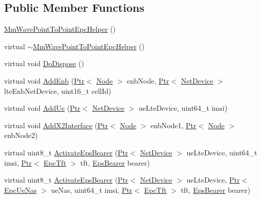 \subsection*{Public Member Functions}
\begin{DoxyCompactItemize}
\item 
\hyperlink{classns3_1_1MmWavePointToPointEpcHelper_a45b842e4b0bda8e4df3a3826c0b945b3}{Mm\+Wave\+Point\+To\+Point\+Epc\+Helper} ()
\item 
virtual \hyperlink{classns3_1_1MmWavePointToPointEpcHelper_a6e19a1cf9dba2dbb72bfab27cf1819b5}{$\sim$\+Mm\+Wave\+Point\+To\+Point\+Epc\+Helper} ()
\item 
virtual void \hyperlink{classns3_1_1MmWavePointToPointEpcHelper_af12665848e18bc78e629726486c92380}{Do\+Dispose} ()
\item 
virtual void \hyperlink{classns3_1_1MmWavePointToPointEpcHelper_a9cd7e12bfdf03508e7a64d5fdf456366}{Add\+Enb} (\hyperlink{classns3_1_1Ptr}{Ptr}$<$ \hyperlink{classns3_1_1Node}{Node} $>$ enb\+Node, \hyperlink{classns3_1_1Ptr}{Ptr}$<$ \hyperlink{classns3_1_1NetDevice}{Net\+Device} $>$ lte\+Enb\+Net\+Device, uint16\+\_\+t cell\+Id)
\item 
virtual void \hyperlink{classns3_1_1MmWavePointToPointEpcHelper_a84fd23b6043ac1b2aeb2c68d5a7deba1}{Add\+Ue} (\hyperlink{classns3_1_1Ptr}{Ptr}$<$ \hyperlink{classns3_1_1NetDevice}{Net\+Device} $>$ ue\+Lte\+Device, uint64\+\_\+t imsi)
\item 
virtual void \hyperlink{classns3_1_1MmWavePointToPointEpcHelper_aa391017eb6455ac779907487e794f531}{Add\+X2\+Interface} (\hyperlink{classns3_1_1Ptr}{Ptr}$<$ \hyperlink{classns3_1_1Node}{Node} $>$ enb\+Node1, \hyperlink{classns3_1_1Ptr}{Ptr}$<$ \hyperlink{classns3_1_1Node}{Node} $>$ enb\+Node2)
\item 
virtual uint8\+\_\+t \hyperlink{classns3_1_1MmWavePointToPointEpcHelper_a559edb52edc66d4d8d1ffd150cb58181}{Activate\+Eps\+Bearer} (\hyperlink{classns3_1_1Ptr}{Ptr}$<$ \hyperlink{classns3_1_1NetDevice}{Net\+Device} $>$ ue\+Lte\+Device, uint64\+\_\+t imsi, \hyperlink{classns3_1_1Ptr}{Ptr}$<$ \hyperlink{classns3_1_1EpcTft}{Epc\+Tft} $>$ tft, \hyperlink{structns3_1_1EpsBearer}{Eps\+Bearer} bearer)
\item 
virtual uint8\+\_\+t \hyperlink{classns3_1_1MmWavePointToPointEpcHelper_a1001c577b4b2796e5db605195f683e71}{Activate\+Eps\+Bearer} (\hyperlink{classns3_1_1Ptr}{Ptr}$<$ \hyperlink{classns3_1_1NetDevice}{Net\+Device} $>$ ue\+Lte\+Device, \hyperlink{classns3_1_1Ptr}{Ptr}$<$ \hyperlink{classns3_1_1EpcUeNas}{Epc\+Ue\+Nas} $>$ ue\+Nas, uint64\+\_\+t imsi, \hyperlink{classns3_1_1Ptr}{Ptr}$<$ \hyperlink{classns3_1_1EpcTft}{Epc\+Tft} $>$ tft, \hyperlink{structns3_1_1EpsBearer}{Eps\+Bearer} bearer)

\end{DoxyCompactItemize}
